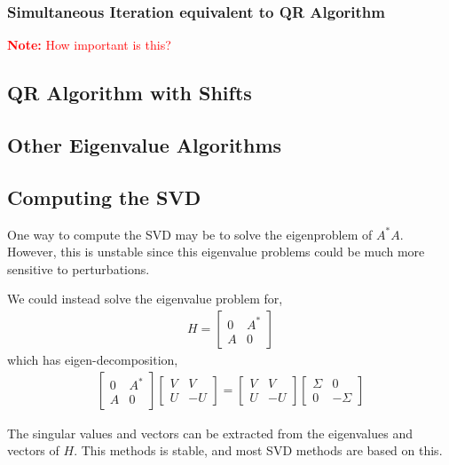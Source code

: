 \documentclass[12pt]{article}
\newcommand{\note}[1]{\textcolor{red}{\textbf{Note:} #1}}
\begin{document}
\subsubsection{Simultaneous Iteration equivalent to QR Algorithm}

\note{How important is this?}


\subsection{QR Algorithm with Shifts}

\subsection{Other Eigenvalue Algorithms}

\subsection{Computing the SVD}

One way to compute the SVD may be to solve the eigenproblem of \( A^*A \). However, this is unstable since this eigenvalue problems could be much more sensitive to perturbations.

We could instead solve the eigenvalue problem for,
\begin{align*}
    H = \left[\begin{array}{cc}0 & A^* \\ A & 0\end{array}\right]
\end{align*}
which has eigen-decomposition,
\begin{align*}
     \left[\begin{array}{cc}0 & A^* \\ A & 0\end{array}\right]
     \left[\begin{array}{cc}V & V \\ U & -U\end{array}\right]
     =
     \left[\begin{array}{cc}V & V \\ U & -U\end{array}\right]
     \left[\begin{array}{cc}\Sigma & 0 \\ 0 & -\Sigma\end{array}\right]
\end{align*}

The singular values and vectors can be extracted from the eigenvalues and vectors of \( H \). This methods is stable, and most SVD methods are based on this.
\end{document}
